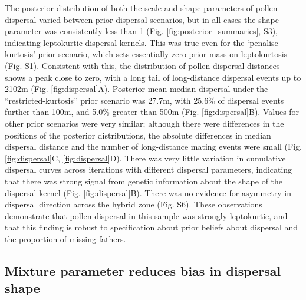 \documentclass[10pt, a4paper, twocolumn]{article} %
\begin{document}
The posterior distribution of both the scale and shape parameters of pollen dispersal varied between prior dispersal scenarios, but in all cases the shape parameter was consistently less than 1 (Fig. \ref{fig:posterior_summaries}, S3), indicating leptokurtic dispersal kernels.
This was true even for the ‘penalise-kurtosis’ prior scenario, which sets essentially zero prior mass on leptokurtosis (Fig. S1).
Consistent with this, the distribution of pollen dispersal distances shows a peak close to zero, with a long tail of long-distance dispersal events up to 2102m (Fig. \ref{fig:dispersal}A).
Posterior-mean median dispersal under the “restricted-kurtosis” prior scenario was 27.7m, with 25.6\% of dispersal events further than 100m, and 5.0\% greater than 500m (Fig. \ref{fig:dispersal}B).
Values for other prior scenarios were very similar; although there were differences in the positions of the posterior distributions, the absolute differences in median dispersal distance and the number of long-distance mating events were small (Fig. \ref{fig:dispersal}C, \ref{fig:dispersal}D).
There was very little variation in cumulative dispersal curves across iterations with different dispersal parameters, indicating that there was strong signal from genetic information about the shape of the dispersal kernel (Fig. \ref{fig:dispersal}B).
There was no evidence for asymmetry in dispersal direction across the hybrid zone (Fig. S6).
These observations demonstrate that pollen dispersal in this sample was strongly leptokurtic, and that this finding is robust to specification about prior beliefs about dispersal and the proportion of missing fathers.

\subsection{Mixture parameter reduces bias in dispersal shape}
\end{document}
